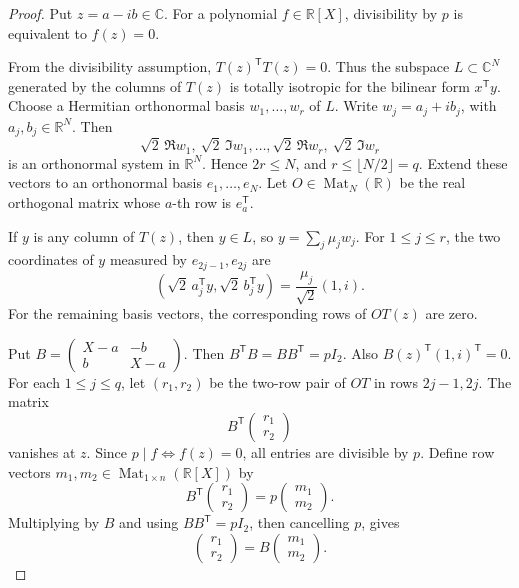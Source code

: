 \documentclass[uplatex,dvipdfmx]{jsarticle}
\newcommand{\Poly}{\mathbb{R}[X]}
\newcommand{\Mat}{\operatorname{Mat}}
\theoremstyle{matrixsosdefinition}
\begin{document}
\begin{proof}
  Put \(z=a-ib\in\mathbb{C}\).  For a polynomial \(f\in\Poly\), divisibility by \(p\) is
  equivalent to \(f(z)=0\).

  From the divisibility assumption, \(T(z)^{\mathsf T}T(z)=0\).  Thus the
  subspace \(L\subset\mathbb{C}^{N}\) generated by the columns of \(T(z)\) is
  totally isotropic for the bilinear form \(x^{\mathsf T}y\).  Choose a
  Hermitian orthonormal basis \(w_1,\ldots,w_r\) of \(L\).  Write
  \(w_j=a_j+ib_j\), with \(a_j,b_j\in\mathbb{R}^{N}\). Then
  \[
    \sqrt2\,\Re w_1,\ \sqrt2\,\Im w_1,\ldots,
    \sqrt2\,\Re w_r,\ \sqrt2\,\Im w_r
  \]
  is an orthonormal system in \(\mathbb{R}^{N}\).  Hence \(2r\le N\), and
  \(r\le\lfloor N/2\rfloor=q\).
  Extend these vectors to an orthonormal basis \(e_1,\ldots,e_N\).  Let
  \(O\in\Mat_N(\mathbb{R})\) be the real orthogonal matrix whose
  \(a\)-th row is \(e_a^{\mathsf T}\).

  If \(y\) is any column of \(T(z)\), then \(y\in L\), so
  \(y=\sum_j\mu_jw_j\).  For \(1\le j\le r\), the two coordinates of \(y\)
  measured by \(e_{2j-1},e_{2j}\) are
  \[
    \left(\sqrt2\,a_j^{\mathsf T}y,\sqrt2\,b_j^{\mathsf T}y\right)
    =\frac{\mu_j}{\sqrt2}(1,i).
  \]
  For the remaining basis vectors, the corresponding rows of \(OT(z)\) are
  zero.

  Put \(B=\begin{pmatrix}X-a&-b\\ b&X-a\end{pmatrix}\).  Then
  \(B^{\mathsf T}B=BB^{\mathsf T}=pI_2\).  Also
  \(B(z)^{\mathsf T}(1,i)^{\mathsf T}=0\).  For each \(1\le j\le q\), let
  \((r_1,r_2)\) be the two-row pair of \(OT\) in rows \(2j-1,2j\).  The matrix
  \[
    B^{\mathsf T}\begin{pmatrix}r_1\\r_2\end{pmatrix}
  \]
  vanishes at \(z\).  Since \(p\mid f\Longleftrightarrow f(z)=0\), all entries
  are divisible by \(p\).  Define row vectors
  \(m_1,m_2\in\Mat_{1\times n}(\Poly)\) by
  \[
    B^{\mathsf T}\begin{pmatrix}r_1\\r_2\end{pmatrix}
      =
    p\begin{pmatrix}m_1\\m_2\end{pmatrix}.
  \]
  Multiplying by \(B\) and using \(BB^{\mathsf T}=pI_2\), then cancelling \(p\),
  gives
  \[
    \begin{pmatrix}r_1\\r_2\end{pmatrix}
      =
    B\begin{pmatrix}m_1\\m_2\end{pmatrix}.
  \]


\end{proof}
\end{document}
